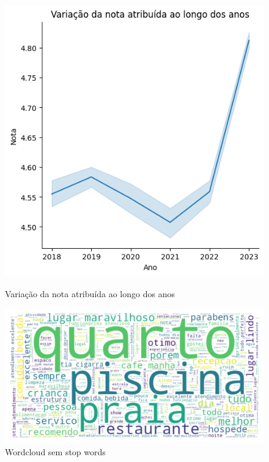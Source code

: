 \begin{figure}
	\centering
	\begin{minipage}{0.45\textwidth}
		\centering
		\includegraphics[width=1\textwidth]{figs/exploratoria/relplot_ano_rating.png}
		\caption{Variação da nota atribuída ao longo dos anos}
		\label{img:relplot_ano_rating}
	\end{minipage}\hfill
	\begin{minipage}{0.45\textwidth}
		\centering
		\includegraphics[width=1\textwidth]{figs/exploratoria/wordcloud_geral.png}
		\caption{Wordcloud sem stop words}
		\label{img:wordcloud_geral}
	\end{minipage}
\end{figure}

